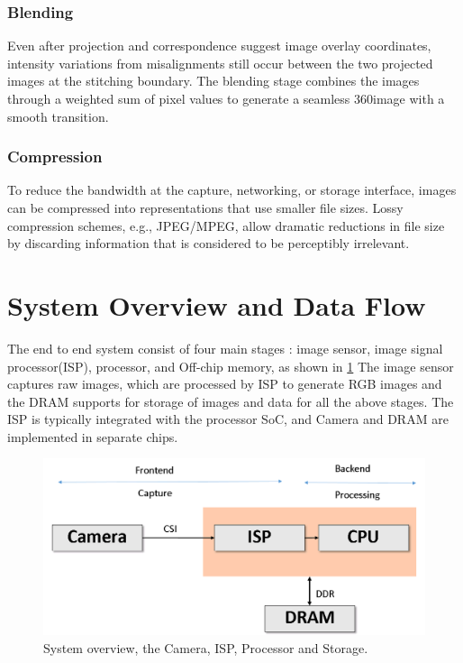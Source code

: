 \subsubsection{Blending}  Even after projection and correspondence suggest image overlay coordinates, intensity variations from misalignments still occur between the two projected images at the stitching boundary. The blending stage combines the images through a weighted sum of pixel values to generate a seamless 360\textdegree    image with a smooth transition.	 
\subsubsection{Compression}  To reduce the bandwidth at the capture, networking, or storage interface, images can be compressed into representations that use smaller file sizes. Lossy compression schemes, e.g., JPEG/MPEG, allow dramatic reductions in file size by discarding information that is considered to be perceptibly irrelevant.


\section{System Overview and Data Flow}

The end to end system consist of four main stages : image sensor, image signal processor(ISP), processor, and Off-chip memory, as shown in \ref{fig:Sys_overview} The image sensor captures raw images, which are processed by ISP to generate RGB images and the DRAM supports for storage of images and data for all the above stages. The ISP is typically integrated with the processor SoC, and Camera and DRAM are implemented in separate chips.
 
\begin{figure}[h]
	\begin{center}
		\includegraphics[width=1\textwidth]{data/images/System_overview.png}
	\end{center}
		\caption{System overview, the Camera, ISP, Processor and Storage.}
\label{fig:Sys_overview}
\end{figure} 

